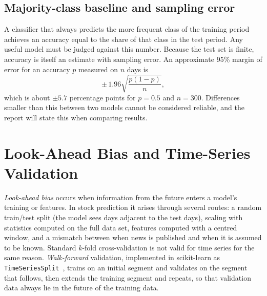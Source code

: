 \subsection{Majority-class baseline and sampling error}
A classifier that always predicts the more frequent class of the training period achieves an accuracy equal to the share of that class in the test period. Any useful model must be judged against this number. Because the test set is finite, accuracy is itself an estimate with sampling error. An approximate 95\% margin of error for an accuracy $p$ measured on $n$ days is
\begin{equation}
\pm\, 1.96\sqrt{\frac{p(1-p)}{n}},
\end{equation}
which is about $\pm 5.7$ percentage points for $p=0.5$ and $n=300$. Differences smaller than this between two models cannot be considered reliable, and the report will state this when comparing results.

\section{Look-Ahead Bias and Time-Series Validation}
\emph{Look-ahead bias} occurs when information from the future enters a model's training or features. In stock prediction it arises through several routes: a random train/test split (the model sees days adjacent to the test days), scaling with statistics computed on the full data set, features computed with a centred window, and a mismatch between when news is published and when it is assumed to be known. Standard $k$-fold cross-validation is not valid for time series for the same reason. \emph{Walk-forward} validation, implemented in scikit-learn as \texttt{TimeSeriesSplit}~\cite{pedregosa2011scikit}, trains on an initial segment and validates on the segment that follows, then extends the training segment and repeats, so that validation data always lie in the future of the training data.
